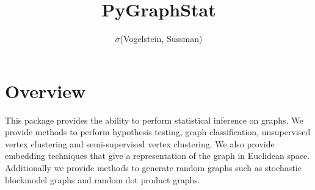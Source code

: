 \documentclass{article}
\theoremstyle{definition}
\begin{document}
\title{PyGraphStat}
\author{$\sigma$(Vogelstein, Sussman)}

\maketitle

\section{Overview} This package provides the ability to perform statistical inference on graphs. We provide methods to perform hypothesis testing, graph classification, unsupervised vertex clustering and semi-supervised vertex clustering. We also provide embedding techniques that give a representation of the graph in Euclidean space. Additionally we provide methods to generate random graphs such as stochastic blockmodel graphs and random dot product graphs. 
\end{document}
